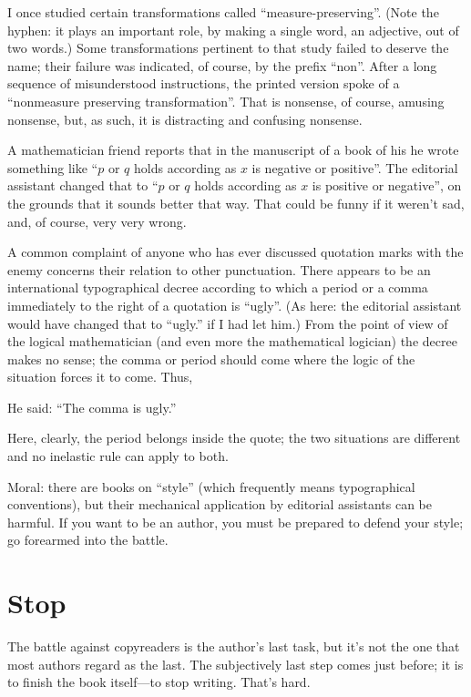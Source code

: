 \documentclass[12pt]{article}
\begin{document}
I once studied certain transformations called ``measure-preserving''. (Note the hyphen: it plays an important role, by making a single word, an adjective, out of two words.) Some transformations pertinent to that study failed to deserve the name; their failure was indicated, of course, by the prefix ``non''. After a long sequence of misunderstood instructions, the printed version spoke of a ``nonmeasure preserving transformation''. That is nonsense, of course, amusing nonsense, but, as such, it is distracting and confusing nonsense. 

A mathematician friend reports that in the manuscript of a book of his he wrote something like ``$p$ or $q$ holds according as $x$ is negative or positive''. The editorial assistant changed that to ``$p$ or $q$ holds according as $x$ is positive or negative'', on the grounds that it sounds better that way. That could be funny if it weren't sad, and, of course, very very wrong. 

A common complaint of anyone who has ever discussed quotation marks with the enemy concerns their relation to other punctuation. There appears to be an international typographical decree according to which a period or a comma immediately to the right of a quotation is ``ugly''. (As here: the editorial assistant would have changed that to ``ugly.'' if I had let him.) From the point of view of the logical mathematician (and even more the mathematical logician) the decree makes no sense; the comma or period should come where the logic of the situation forces it to come. Thus, 
\begin{center}
    He said: ``The comma is ugly.'' 
\end{center}
Here, clearly, the period belongs inside the quote; the two situations are different and no inelastic rule can apply to both.

Moral: there are books on ``style'' (which frequently means typographical conventions), but their mechanical application by editorial assistants can be harmful. If you want to be an author, you must be prepared to defend your style; go forearmed into the battle. 

\section{Stop}

The battle against copyreaders is the author's last task, but it's not the one that most authors regard as the last. The subjectively last step comes just before; it is to finish the book itself---to stop writing. That's hard. 
\end{document}
